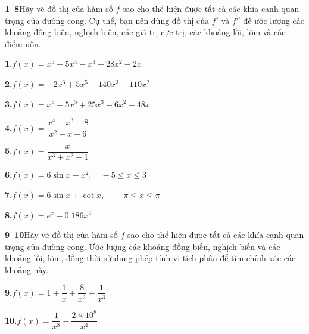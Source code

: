 \documentclass[10pt]{article}
\begin{document}
\vspace{0.35cm}

\noindent
\begin{minipage}[t]{0.48\textwidth}
  \fontsize{9.5}{13.5}\selectfont
  \textbf{\textsf{\color{stewartcyan}1--8}}\enspace Hãy vẽ đồ thị của hàm số $f$ sao cho thể hiện được tất cả các khía cạnh quan trọng của đường cong. Cụ thể, bạn nên dùng đồ thị của $f'$ và $f''$ để ước lượng các khoảng đồng biến, nghịch biến, các giá trị cực trị, các khoảng lồi, lõm và các điểm uốn.

  \vspace{7pt}
  \textbf{1.}\enspace $f(x) = x^5 - 5x^4 - x^3 + 28x^2 - 2x$

  \vspace{6pt}
  \textbf{2.}\enspace $f(x) = -2x^6 + 5x^5 + 140x^3 - 110x^2$

  \vspace{6pt}
  \textbf{3.}\enspace $f(x) = x^6 - 5x^5 + 25x^3 - 6x^2 - 48x$

  \vspace{6pt}
  \textbf{4.}\enspace $f(x) = \dfrac{x^4 - x^3 - 8}{x^2 - x - 6}$

  \vspace{8pt}
  \textbf{5.}\enspace $f(x) = \dfrac{x}{x^3 + x^2 + 1}$

  \vspace{8pt}
  \textbf{6.}\enspace $f(x) = 6\sin x - x^2, \quad -5 \leqslant x \leqslant 3$
\end{minipage}%
\hfill
\begin{minipage}[t]{0.48\textwidth}
  \fontsize{9.5}{13.5}\selectfont
  \textbf{7.}\enspace $f(x) = 6\sin x + \cot x, \quad -\pi \leqslant x \leqslant \pi$

  \vspace{6pt}
  \textbf{8.}\enspace $f(x) = e^x - 0.186x^4$

  \vspace{8pt}
  \textbf{\textsf{\color{stewartcyan}9--10}}\enspace Hãy vẽ đồ thị của hàm số $f$ sao cho thể hiện được tất cả các khía cạnh quan trọng của đường cong. Ước lượng các khoảng đồng biến, nghịch biến và các khoảng lồi, lõm, đồng thời sử dụng phép tính vi tích phân để tìm chính xác các khoảng này.

  \vspace{7pt}
  \textbf{9.}\enspace $f(x) = 1 + \dfrac{1}{x} + \dfrac{8}{x^2} + \dfrac{1}{x^3}$

  \vspace{9pt}
  \textbf{10.}\enspace $f(x) = \dfrac{1}{x^8} - \dfrac{2 \times 10^8}{x^4}$
\end{minipage}
\end{document}
